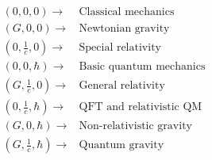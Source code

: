 \[
\begin{array}{rl}
(0,0,0)\rightarrow & \text{Classical mechanics} \\[0.15cm]
(G,0,0)\rightarrow & \text{Newtonian gravity} \\[0.15cm]
\left(0,\frac{1}{c},0\right)\rightarrow & \text{Special relativity} \\[0.15cm]
(0,0,\hbar)\rightarrow & \text{Basic quantum mechanics} \\[0.15cm]
\left(G,\frac{1}{c},0\right)\rightarrow & \text{General relativity} \\[0.15cm]
\left(0,\frac{1}{c},\hbar\right)\rightarrow & \text{QFT and relativistic QM} \\[0.15cm]
(G,0,\hbar)\rightarrow & \text{Non-relativistic gravity} \\[0.15cm]
\left(G,\frac{1}{c},\hbar\right)\rightarrow & \text{Quantum gravity}
\end{array}
\]